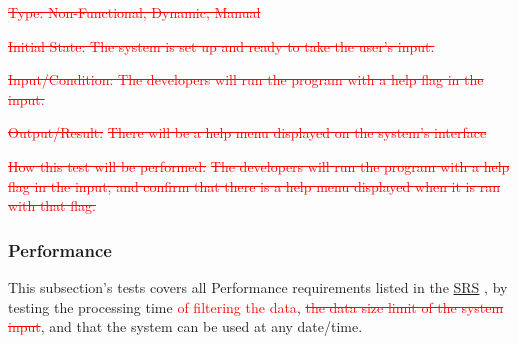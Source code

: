 \documentclass[12pt, titlepage]{article}
\begin{document}
\begin{enumerate}
{\textcolor{red}{\sout{Type: Non-Functional, Dynamic, Manual}}}
					
{\textcolor{red}{\sout{Initial State: The system is set up and ready to take the user's input.}}}

{\textcolor{red}{\sout{Input/Condition: The developers will run the program with a help flag in the input.}}}
			
{\textcolor{red}{\sout{Output/Result: }}}
{\textcolor{red}{\sout{There will be a help menu displayed on the system's interface}}}

{\textcolor{red}{\sout{How this test will be performed:}}}
{\textcolor{red}{\sout{The developers will run the program with a help flag in the input, and confirm that there is a help menu displayed when it is ran with that flag.}}}

\end{enumerate}

\subsubsection{Performance}
This subsection's tests covers all Performance requirements listed in the \href{https://github.com/paezha/PyERT-BLACK/blob/main/docs/SRS/SRS.pdf}{SRS} \citep{SRS}, by testing the processing time \textcolor{red}{of filtering the data}, \textcolor{red}{\sout{the data size limit of the system input}}, and that the system can be used at any date/time. 
\end{document}
